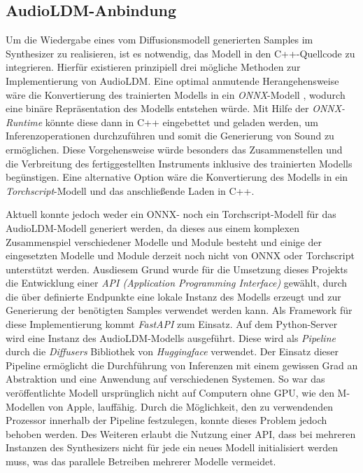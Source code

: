 \documentclass[
  a4paper,  %
  twoside,  %
  bibliography=totoc,
  headsepline,
  cleardoublepage=empty,
  parskip=half,
  draft=false
]{scrbook}
\begin{document}
\subsection{AudioLDM-Anbindung} \label{sec:api}
Um die Wiedergabe eines vom Diffusionsmodell generierten Samples im Synthesizer zu realisieren, ist es notwendig, das Modell in den C++-Quellcode zu integrieren. Hierfür existieren prinzipiell drei mögliche Methoden zur Implementierung von AudioLDM. Eine optimal anmutende Herangehensweise wäre die Konvertierung des trainierten Modells in ein \emph{ONNX}-Modell \cite{noauthor_onnx_nodate-1}, wodurch eine binäre Repräsentation des Modells entstehen würde. Mit Hilfe der \emph{ONNX-Runtime} \cite{noauthor_onnx_nodate} könnte diese dann in C++ eingebettet und geladen werden, um Inferenzoperationen durchzuführen und somit die Generierung von Sound zu ermöglichen. Diese Vorgehensweise würde besonders das Zusammenstellen und die Verbreitung des fertiggestellten Instruments inklusive des trainierten Modells begünstigen. Eine alternative Option wäre die Konvertierung des Modells in ein \emph{Torchscript}-Modell \cite{noauthor_torchscript_nodate} und das anschließende Laden in C++. \cite{oli_larkin_machine_2023} 

Aktuell konnte jedoch weder ein ONNX- noch ein Torchscript-Modell für das AudioLDM-Modell generiert werden, da dieses aus einem komplexen Zusammenspiel verschiedener Modelle und Module besteht und einige der eingesetzten Modelle und Module derzeit noch nicht von ONNX oder Torchscript unterstützt werden. Ausdiesem Grund wurde für die Umsetzung dieses Projekts die Entwicklung einer \emph{API (Application Programming Interface)} gewählt, durch die über definierte Endpunkte eine lokale Instanz des Modells erzeugt und zur Generierung der benötigten Samples verwendet werden kann. Als Framework für diese Implementierung kommt \emph{FastAPI} \cite{noauthor_fastapi_nodate} zum Einsatz. Auf dem Python-Server wird eine Instanz des AudioLDM-Modells ausgeführt. Diese wird als \emph{Pipeline} durch die \emph{Diffusers} Bibliothek von \emph{Huggingface} \cite{noauthor_huggingface_nodate} verwendet. Der Einsatz dieser Pipeline ermöglicht die Durchführung von Inferenzen mit einem gewissen Grad an Abstraktion und eine Anwendung auf verschiedenen Systemen. So war das veröffentlichte Modell ursprünglich nicht auf Computern ohne GPU, wie den M-Modellen von Apple, lauffähig. Durch die Möglichkeit, den zu verwendenden Prozessor innerhalb der Pipeline festzulegen, konnte dieses Problem jedoch behoben werden. Des Weiteren erlaubt die Nutzung einer API, dass bei mehreren Instanzen des Synthesizers nicht für jede ein neues Modell initialisiert werden muss, was das parallele Betreiben mehrerer Modelle vermeidet.
\end{document}
